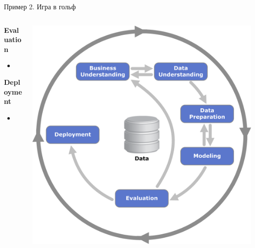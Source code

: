 \documentclass[aspectratio=169]{beamer}
\begin{document}
\begin{frame}{Пример 2. Игра в гольф}

\begin{columns}
    \begin{column}{.7\textwidth}
		{\bf Evaluation}
		\begin{itemize}
		\item 
		\end{itemize}
		
		\vspace{1em}

		{\bf Deployment}
		\begin{itemize}
		\item 
		\end{itemize}
    \end{column}
    \begin{column}{.3\textwidth}
    \vspace{-0em}
		\begin{center}
   		\includegraphics[width=\textwidth]{images/crisp.png}
    \end{center}
    \end{column}
  \end{columns}

\end{frame}
\end{document}
